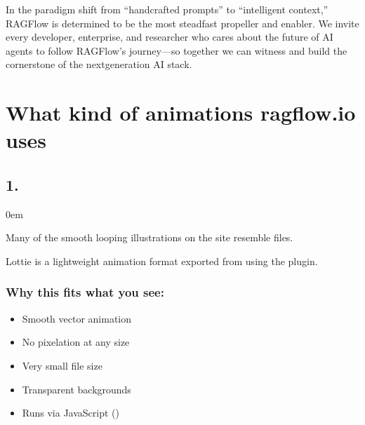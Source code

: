 \documentclass[letterpaper,10pt,english]{sphinxmanual}
\begin{document}
\sphinxAtStartPar
In the paradigm shift from “hand\sphinxhyphen{}crafted prompts” to “intelligent context,” RAGFlow is determined to be the most steadfast propeller and enabler. We invite every developer, enterprise, and researcher who cares about the future of AI agents to follow RAGFlow’s journey—so together we can witness and build the cornerstone of the next\sphinxhyphen{}generation AI stack.

\sphinxstepscope


\chapter{What kind of animations ragflow.io uses}
\label{\detokenize{web-design:what-kind-of-animations-ragflow-io-uses}}\label{\detokenize{web-design::doc}}

\section{1. }
\label{\detokenize{web-design:lottie-animations-very-likely}}
\begin{DUlineblock}{0em}
\item[] Many of the smooth looping illustrations on the site resemble
 files.
\item[] Lottie is a lightweight animation format exported from  using the  plugin.
\end{DUlineblock}


\subsection{Why this fits what you see:}
\label{\detokenize{web-design:why-this-fits-what-you-see}}\begin{itemize}
\item {} 
\sphinxAtStartPar
Smooth vector animation

\item {} 
\sphinxAtStartPar
No pixelation at any size

\item {} 
\sphinxAtStartPar
Very small file size

\item {} 
\sphinxAtStartPar
Transparent backgrounds

\item {} 
\sphinxAtStartPar
Runs via JavaScript ()

\end{itemize}
\end{document}
